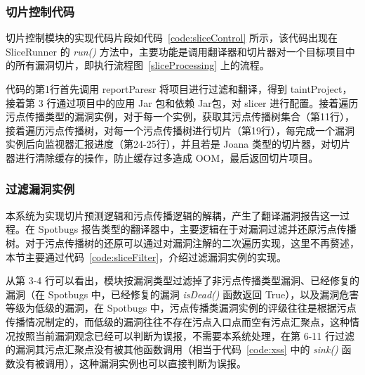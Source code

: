 \subsubsection{切片控制代码}

切片控制模块的实现代码片段如代码~\ref{code:sliceControl} 所示，该代码出现在 SliceRunner 的 \textit{run()} 方法中，主要功能是调用翻译器和切片器对一个目标项目中的所有漏洞切片，即执行流程图~\ref{sliceProcessing} 上的流程。

代码的第1行首先调用 reportParesr 将项目进行过滤和翻译，得到 taintProject， 接着第 3 行通过项目中的应用 Jar 包和依赖 Jar包，对 slicer 进行配置。接着遍历污点传播类型的漏洞实例，对于每一个实例，获取其污点传播树集合（第11行），接着遍历污点传播树，对每一个污点传播树进行切片（第19行），每完成一个漏洞实例后向监视器汇报进度（第24-25行），并且若是 Joana 类型的切片器，对切片器进行清除缓存的操作，防止缓存过多造成 OOM，最后返回切片项目。\\

\begin{minipage}[!h!t!b!p]{0.9\textwidth}
    
\end{minipage}

\subsubsection{过滤漏洞实例}

本系统为实现切片预测逻辑和污点传播逻辑的解耦，产生了翻译漏洞报告这一过程。在 Spotbugs 报告类型的翻译器中，主要逻辑在于对漏洞过滤并还原污点传播树。对于污点传播树的还原可以通过对漏洞注解的二次遍历实现，这里不再赘述，本节主要通过代码~\ref{code:sliceFilter}，介绍过滤漏洞实例的实现。

\begin{minipage}[!htbp]{0.9\textwidth}
    
\end{minipage}

从第 3-4 行可以看出，模块按漏洞类型过滤掉了非污点传播类型漏洞、已经修复的漏洞（在 Spotbugs 中，已经修复的漏洞 \textit{isDead()} 函数返回 True），以及漏洞危害等级为低级的漏洞，在 Spotbugs 中，污点传播类漏洞实例的评级往往是根据污点传播情况制定的，而低级的漏洞往往不存在污点入口点而空有污点汇聚点，这种情况按照当前漏洞观念已经可以判断为误报，不需要本系统处理，在第 6-11 行过滤的漏洞其污点汇聚点没有被其他函数调用（相当于代码~\ref{code:xss} 中的 \textit{sink()} 函数没有被调用），这种漏洞实例也可以直接判断为误报。

